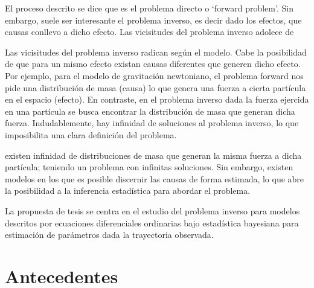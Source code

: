 \documentclass{article}
\begin{document}
El proceso descrito se dice que es el problema directo o `forward problem'. Sin embargo, suele ser interesante el problema inverso, es decir dado los efectos, que causas conllevo a dicho efecto. Las vicisitudes del problema inverso adolece de 







Las vicisitudes del problema inverso radican según el modelo. Cabe la posibilidad de que para un mismo efecto existan causas diferentes que generen dicho efecto. Por ejemplo, para el modelo de gravitación newtoniano, el problema forward nos pide una distribución de masa (causa) lo que genera una fuerza a cierta partícula en el espacio (efecto). En contraste, en el problema inverso dada la fuerza ejercida en una partícula se busca encontrar la distribución de masa que generan dicha fuerza. Indudablemente, hay infinidad de soluciones al problema inverso, lo que imposibilita una clara definición del problema.


existen infinidad de distribuciones de masa que generan la misma fuerza a dicha partícula; teniendo un problema con infinitas soluciones. Sin embargo, existen modelos en los que es posible discernir las causas de forma estimada, lo que abre la posibilidad a la inferencia estadística para abordar el problema.

La propuesta de tesis se centra en el estudio del problema inverso para modelos descritos por ecuaciones diferenciales ordinarias bajo estadística bayesiana para estimación de parámetros dada la trayectoria observada. 




\section*{Antecedentes}





\end{document}
